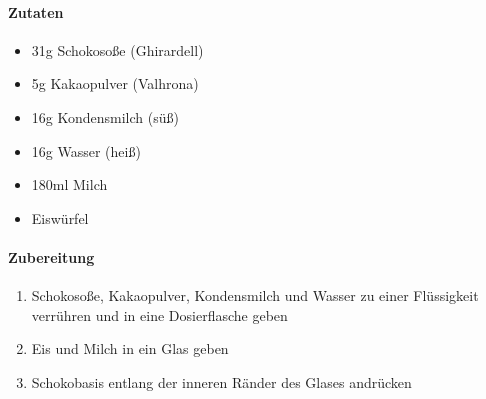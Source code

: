 \clearpage
{}

\paragraph{Zutaten}
\begin{itemize}[noitemsep]
	\item 31g Schokosoße (Ghirardell)
	\item 5g Kakaopulver (Valhrona)
	\item 16g Kondensmilch (süß)
	\item 16g Wasser (heiß)
	\item 180ml Milch
	\item Eiswürfel
\end{itemize}

\paragraph{Zubereitung}
\begin{enumerate}[noitemsep]
	\item Schokosoße, Kakaopulver, Kondensmilch und Wasser zu einer Flüssigkeit verrühren und in eine Dosierflasche geben
	\item Eis und Milch in ein Glas geben
	\item Schokobasis entlang der inneren Ränder des Glases andrücken
\end{enumerate}